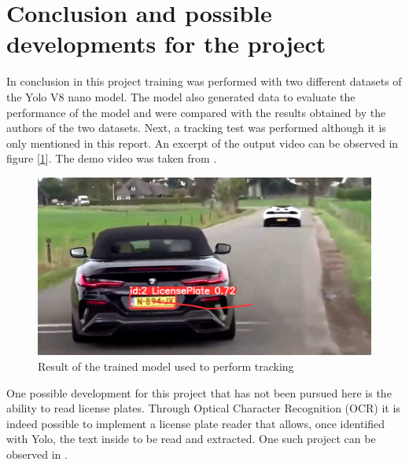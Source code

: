 \documentclass[12pt]{article}
\begin{document}

\section{Conclusion and possible developments for the project}
In conclusion in this project training was performed with two different datasets of the Yolo V8 nano model. The model also generated data to evaluate the performance of the model and were compared with the results obtained by the authors of the two datasets. Next, a tracking test was performed although it is only mentioned in this report. An excerpt of the output video can be observed in figure [\ref{fig:mesh5}]. The demo video was taken from \cite{github2}.

\begin{figure}[H]
    \centering
    \includegraphics[width=0.5\linewidth]{tracking example.png}
    \caption{Result of the trained model used to perform tracking}
    \label{fig:mesh5}
\end{figure}
One possible development for this project that has not been pursued here is the ability to read license plates. Through Optical Character Recognition (OCR) it is indeed possible to implement a license plate reader that allows, once identified with Yolo, the text inside to be read and extracted. One such project can be observed in \cite{github1}.


\clearpage


\begin{flushleft}
  
\end{flushleft}

\end{document}
